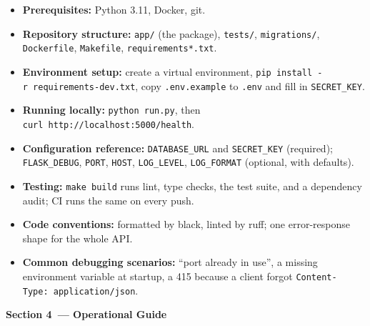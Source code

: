 \begin{itemize}
\tightlist
\item
  \textbf{Prerequisites:} Python 3.11, Docker, git.
\item
  \textbf{Repository structure:} \texttt{app/} (the package), \texttt{tests/}, \texttt{migrations/}, \texttt{Dockerfile}, \texttt{Makefile}, \texttt{requirements*.txt}.
\item
  \textbf{Environment setup:} create a virtual environment, \texttt{pip\ install\ -}\allowbreak{}\texttt{r\ requirements-}\allowbreak{}\texttt{dev.}\allowbreak{}\texttt{txt}, copy \texttt{.env.example} to \texttt{.env} and fill in \texttt{SECRET\_KEY}.
\item
  \textbf{Running locally:} \texttt{python\ run.py}, then \texttt{curl\ http:}\allowbreak{}\texttt{/}\allowbreak{}\texttt{/}\allowbreak{}\texttt{localhost:}\allowbreak{}\texttt{5000/}\allowbreak{}\texttt{health}.
\item
  \textbf{Configuration reference:} \texttt{DATABASE\_URL} and \texttt{SECRET\_KEY} (required); \texttt{FLASK\_DEBUG}, \texttt{PORT}, \texttt{HOST}, \texttt{LOG\_LEVEL}, \texttt{LOG\_FORMAT} (optional, with defaults).
\item
  \textbf{Testing:} \texttt{make\ build} runs lint, type checks, the test suite, and a dependency audit; CI runs the same on every push.
\item
  \textbf{Code conventions:} formatted by black, linted by ruff; one error-response shape for the whole API.
\item
  \textbf{Common debugging scenarios:} ``port already in use'', a missing environment variable at startup, a 415 because a client forgot \texttt{Content-}\allowbreak{}\texttt{Type:}\allowbreak{}\texttt{\ application/}\allowbreak{}\texttt{json}.
\end{itemize}

\noindent{}\textbf{Section 4~--- Operational Guide}

